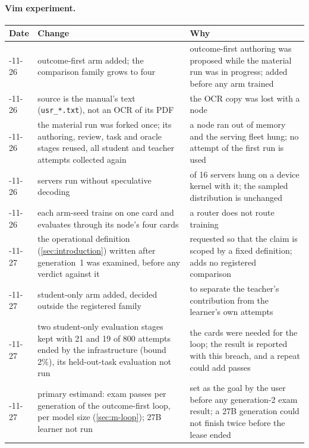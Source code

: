 \paragraph{Vim experiment.}

{\footnotesize
\begin{longtable}{>{\raggedright\arraybackslash}p{17mm}>{\raggedright\arraybackslash}p{64mm}>{\raggedright\arraybackslash}p{60mm}}
\toprule
Date & Change & Why \\
\midrule
\endhead

2026-11-26 & outcome-first arm added; the comparison family grows to four & outcome-first authoring was proposed while the
material run was in progress; added before any arm trained \\
2026-11-26 & source is the manual's text (\texttt{usr\_*.txt}), not an OCR of its PDF & the OCR copy was lost with a node \\
2026-11-26 & the material run was forked once; its authoring, review, task and oracle stages reused, all student and teacher
attempts collected again & a node ran out of memory and the serving fleet hung; no attempt of the first run is used \\
2026-11-26 & servers run without speculative decoding & 7 of 16 servers hung on a device kernel with it; the sampled
distribution is unchanged \\
2026-11-26 & each arm-seed trains on one card and evaluates through its node's four cards & a router does not route training \\
2026-11-27 & the operational definition (\cref{sec:introduction}) written after generation~1 was examined, before any verdict
against it & requested so that the claim is scoped by a fixed definition; adds no registered comparison \\
2026-11-27 & student-only arm added, decided outside the registered family & to separate the teacher's contribution from
the learner's own attempts \\
2026-11-27 & two student-only evaluation stages kept with 21 and 19 of 800 attempts ended by the infrastructure (bound 2\%),
its held-out-task evaluation not run & the cards were needed for the loop; the result is reported with this breach, and a repeat
could add passes \\
2026-11-27 & primary estimand: exam passes per generation of the outcome-first loop, per model size (\cref{sec:m-loop});
27B learner not run & set as the goal by the user before any generation-2 exam result; a 27B generation could not finish
twice before the lease ended \\

\end{longtable}}
